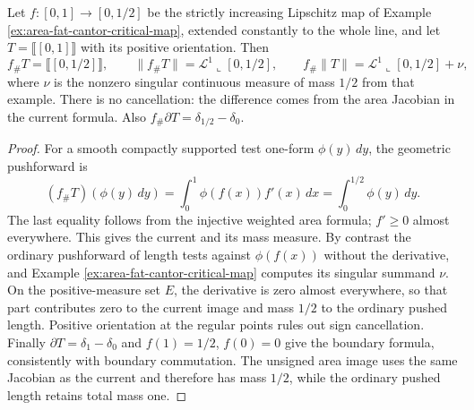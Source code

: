 \begin{example}\label{ex:current-fat-cantor-measure-distinction}
Let $f:[0,1]\to[0,1/2]$ be the strictly increasing Lipschitz map of Example \ref{ex:area-fat-cantor-critical-map}, extended constantly to the whole line, and let $T=\llbracket[0,1]\rrbracket$ with its positive orientation. Then
\[
 f_\#T=\llbracket[0,1/2]\rrbracket,
 \qquad \|f_\#T\|=\mathcal L^1\llcorner[0,1/2],
 \qquad f_\#\|T\|=\mathcal L^1\llcorner[0,1/2]+\nu,
\]
where $\nu$ is the nonzero singular continuous measure of mass $1/2$ from that example. There is no cancellation: the difference comes from the area Jacobian in the current formula. Also $f_\#\partial T=\delta_{1/2}-\delta_0$.
\end{example}
\begin{proof}
For a smooth compactly supported test one-form $\phi(y)\,dy$, the geometric pushforward is
\[
 (f_\#T)(\phi(y)\,dy)=\int_0^1\phi(f(x))f'(x)\,dx
 =\int_0^{1/2}\phi(y)\,dy.
\]
The last equality follows from the injective weighted area formula; $f'\geq0$ almost everywhere. This gives the current and its mass measure. By contrast the ordinary pushforward of length tests against $\phi(f(x))$ without the derivative, and Example \ref{ex:area-fat-cantor-critical-map} computes its singular summand $\nu$. On the positive-measure set $E$, the derivative is zero almost everywhere, so that part contributes zero to the current image and mass $1/2$ to the ordinary pushed length. Positive orientation at the regular points rules out sign cancellation. Finally $\partial T=\delta_1-\delta_0$ and $f(1)=1/2$, $f(0)=0$ give the boundary formula, consistently with boundary commutation. The unsigned area image uses the same Jacobian as the current and therefore has mass $1/2$, while the ordinary pushed length retains total mass one.
\end{proof}

